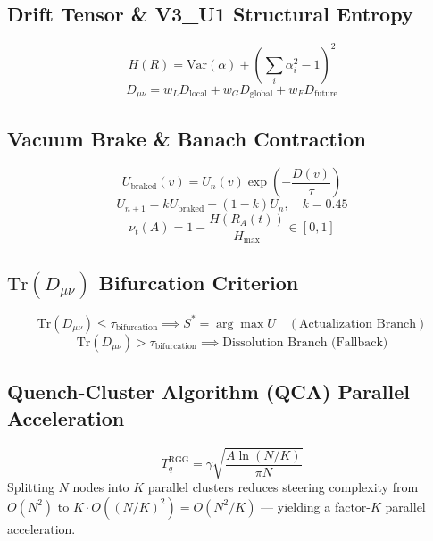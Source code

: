 \documentclass[11pt,a4paper]{article}
\begin{document}
\subsection{Drift Tensor \& V3\_U1 Structural Entropy}
\begin{equation}
H(R) = \text{Var}(\alpha) + \left(\sum_i \alpha_i^2 - 1\right)^2
\end{equation}
\begin{equation}
D_{\mu\nu} = w_L D_{\text{local}} + w_G D_{\text{global}} + w_F D_{\text{future}}
\end{equation}

\subsection{Vacuum Brake \& Banach Contraction}
\begin{equation}
U_{\text{braked}}(v) = U_n(v) \exp\left(-\frac{D(v)}{\tau}\right)
\end{equation}
\begin{equation}
U_{n+1} = k U_{\text{braked}} + (1 - k) U_n, \quad k = 0.45
\end{equation}
\begin{equation}
\nu_t(A) = 1 - \frac{H(R_A(t))}{H_{\max}} \in [0, 1]
\end{equation}

\subsection{$\text{Tr}(D_{\mu\nu})$ Bifurcation Criterion}
\begin{equation}
\text{Tr}(D_{\mu\nu}) \le \tau_{\text{bifurcation}} \implies S^* = \arg\max U \quad (\text{Actualization Branch})
\end{equation}
\begin{equation}
\text{Tr}(D_{\mu\nu}) > \tau_{\text{bifurcation}} \implies \text{Dissolution Branch (Fallback)}
\end{equation}

\subsection{Quench-Cluster Algorithm (QCA) Parallel Acceleration}
\begin{equation}
T_q^{\text{RGG}} = \gamma \sqrt{\frac{A \ln(N/K)}{\pi N}}
\end{equation}
Splitting $N$ nodes into $K$ parallel clusters reduces steering complexity from $O(N^2)$ to $K \cdot O((N/K)^2) = O(N^2/K)$ --- yielding a factor-$K$ parallel acceleration.
\end{document}
